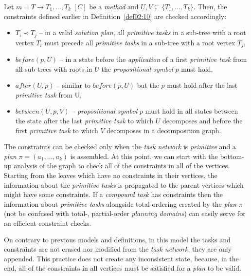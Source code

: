 \medskip\noindent
Let $m = T \rightarrow T_1, \dots, T_k \; [C]$ be a \emph{method} and $U,V \subseteq \{ T_1, \dots, T_k \}$. Then, the constraints defined earlier in Definition~\ref{def02:10} are checked accordingly:

\begin{itemize}
    \item $T_i \prec T_j$ – in a valid \emph{solution plan}, all \emph{primitive tasks} in a sub-tree with a root vertex $T_i$ must precede all \emph{primitive tasks} in a sub-tree with a root vertex $T_j$,

    \item $before(p, U)$ – in a state before the \emph{application} of a first \emph{primitive task} from all sub-trees with roots in $U$ the \emph{propositional symbol} $p$ must hold,

    \item $after(U, p)$ – similar to $before(p, U)$ but the $p$ must hold after the last \emph{primitive task} from U,

    \item $between(U, p, V)$ – \emph{propositional symbol} $p$ must hold in all states between the state after the last \emph{primitive task} to which $U$ decomposes and before the first \emph{primitive task} to which $V$ decomposes in a decomposition graph.
\end{itemize}

\medskip\noindent
The constraints can be checked only when the \emph{task network} is \emph{primitive} and a \emph{plan} $\pi = (a_1, \dots, a_k)$ is assembled. At this point, we can start with the bottom-up analysis of the graph to check all of the constraints in all of the vertices. Starting from the leaves which have no constraints in their vertices, the information about the \emph{primitive tasks} is propagated to the parent vertices which might have some constraints. If a \emph{compound task} has constraints then the information about \emph{primitive tasks} alongside total-ordering created by the \emph{plan} $\pi$ (not be confused with total-, partial-order \emph{planning domains}) can easily serve for an efficient constraint checks. 

\medskip\noindent
On contrary to previous models and definitions, in this model the tasks and constraints are not erased nor modified from the \emph{task network}, they are only appended. This practice does not create any inconsistent state, because, in the end, all of the constraints in all vertices must be satisfied for a \emph{plan} to be valid. 

